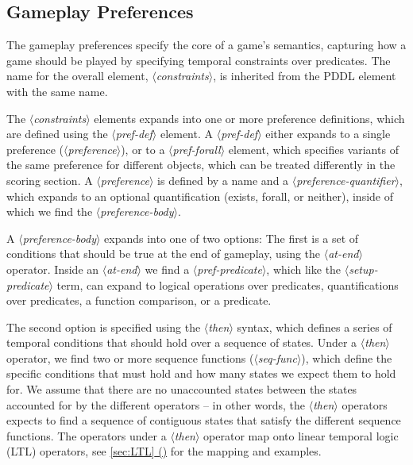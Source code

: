 \documentclass{article}
\newcommand{\dsl}[1]{{\it $\langle$#1$\rangle$}}
\newcommand*{\fullref}[1]{\hyperref[{#1}]{\autoref*{#1} (\nameref*{#1})}} %
\begin{document}
\subsection{Gameplay Preferences} \label{sec:constraints}
The gameplay preferences specify the core of a game's semantics, capturing how a game should be played by specifying temporal constraints over predicates.
The name for the overall element, \dsl{constraints}, is inherited from the PDDL element with the same name.

The \dsl{constraints} elements expands into one or more preference definitions, which are defined using the \dsl{pref-def} element.
A \dsl{pref-def} either expands to a single preference (\dsl{preference}), or to a \dsl{pref-forall} element, which specifies variants of the same preference for different objects, which can be treated differently in the scoring section.
A \dsl{preference} is defined by a name and a \dsl{preference-quantifier}, which expands to an optional quantification (exists, forall, or neither), inside of which we find the \dsl{preference-body}.

A \dsl{preference-body} expands into one of two options:
The first is a set of conditions that should be true at the end of gameplay, using the \dsl{at-end} operator.
Inside an \dsl{at-end} we find a \dsl{pref-predicate}, which like the \dsl{setup-predicate} term, can expand to logical operations over predicates, quantifications over predicates, a function comparison, or a predicate.

The second option is specified using the \dsl{then} syntax, which defines a series of temporal conditions that should hold over a sequence of states.
Under a \dsl{then} operator, we find two or more sequence functions (\dsl{seq-func}), which define the specific conditions that must hold and how many states we expect them to hold for.
We assume that there are no unaccounted states between the states accounted for by the different operators -- in other words, the \dsl{then} operators expects to find a sequence of contiguous states that satisfy the different sequence functions.
The operators under a \dsl{then} operator map onto linear temporal logic (LTL) operators, see \fullref{sec:LTL} for the mapping and examples.
\end{document}
